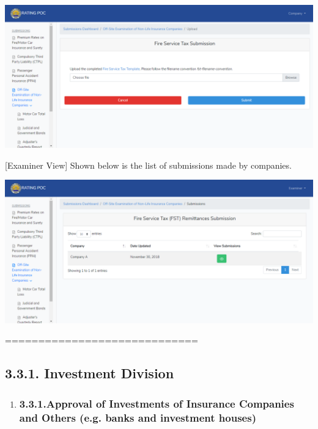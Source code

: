 \documentclass{article}
\begin{document}
\includegraphics[keepaspectratio=true]{up-ic-screens/image16}{}%

[Examiner View] Shown below is the list of
submissions made by companies.%

\includegraphics[keepaspectratio=true]{up-ic-screens/image56}{}%

\mdhr{}%

\noindent{}=============================%

\subsection{3.3.\hspace*{0.5em}1.  Investment Division}\label{sec-1-investment-division}%

\begin{enumerate}[noitemsep,topsep=\mdcompacttopsep]%

\item{}
\subsubsection{3.3.1.\hspace*{0.5em}Approval of Investments of Insurance Companies and Others (e.g. banks and investment houses)}\label{sec-approval-of-investments-of-insurance-companies-and-others-eg-banks-and-investment-houses}%
\end{enumerate}%
\end{document}
